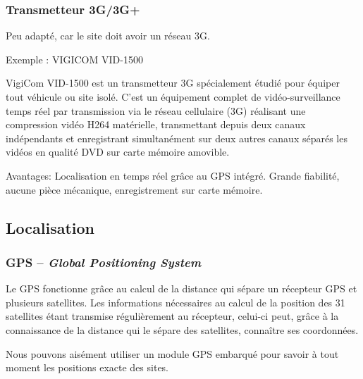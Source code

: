 \subsubsection{Transmetteur 3G/3G+}

Peu adapté, car le site doit avoir un réseau 3G.

Exemple : VIGICOM VID-1500

\begin{figure}
\begin{center}


\end{center}
\end{figure}

VigiCom VID-1500 est un transmetteur 3G spécialement étudié pour équiper tout véhicule ou site isolé. C’est un équipement complet de vidéo-surveillance temps réel par transmission via le réseau cellulaire (3G) réalisant une compression vidéo H264 matérielle, transmettant depuis deux canaux indépendants et enregistrant simultanément sur deux autres canaux séparés les vidéos en qualité DVD sur carte mémoire amovible.

Avantages:
Localisation en temps réel grâce au GPS intégré. 
Grande fiabilité, aucune pièce mécanique, enregistrement sur carte mémoire.
\subsection{Localisation}

\subsubsection{GPS – \textsl{Global Positioning System}}

Le GPS fonctionne grâce au calcul de la distance qui sépare un récepteur GPS et plusieurs satellites. Les informations nécessaires au calcul de la position des 31 satellites étant transmise régulièrement au récepteur, celui-ci peut, grâce à la connaissance de la distance qui le sépare des satellites, connaître ses coordonnées.

Nous pouvons aisément utiliser un module GPS embarqué pour savoir à tout moment les positions exacte des sites.

